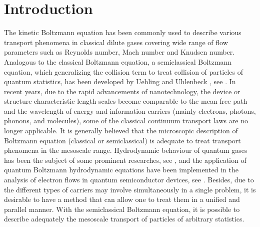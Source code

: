 \documentclass{rsproca}%
\begin{document}



\maketitle

\section{Introduction}
\label{sec:1}

The kinetic Boltzmann equation has been commonly used to describe various transport phenomena in classical dilute gases covering wide range of flow parameters such as Reynolds number, Mach number and Knudsen number.   Analogous to the classical Boltzmann equation, a semiclassical Boltzmann equation, which generalizing the collision term to treat collision of particles of quantum statistics, has been developed by Uehling and Uhlenbeck \cite{PhysRev.43.552}, see \cite{KadanoffBaym,PhysRev.43.552}.
In recent years, due to the rapid advancements of nanotechnology, the device or structure characteristic length scales become comparable to the mean free path and the wavelength of energy and information carriers (mainly electrons, photons, phonons, and molecules), some of the classical continuum transport laws are no longer applicable.   It is generally believed that the microscopic description of Boltzmann equation (classical or semiclassical) is adequate to treat transport phenomena in the mesoscale range.  Hydrodynamic behaviour of quantum gases has been the subject of some prominent researches, see \cite{nikuni98,PhysRev.40.749,PhysRevB.35.7959}, and the application of quantum Boltzmann hydrodynamic equations have been implemented in the analysis of electron flows in quantum semiconductor devices, see \cite{Gardner1994,PhysRevB.39.9536,Woolard5146296}.  Besides, due to the different types of carriers may involve simultaneously in a single problem, it is desirable to have a method that can allow one to treat them in a unified and parallel manner.   With the semiclassical Boltzmann equation, it is possible to describe adequately the mesoscale transport of particles of arbitrary statistics.
\end{document}

